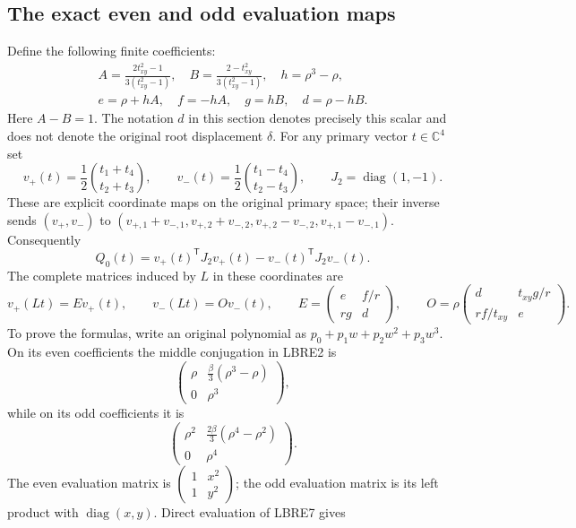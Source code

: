 \documentclass[11pt,a4paper]{article}
\begin{document}
\subsection{The exact even and odd evaluation maps}
Define the following finite coefficients:
\[
 \begin{gathered}
 A=\frac{2t_{xy}^2-1}{3(t_{xy}^2-1)},\quad
 B=\frac{2-t_{xy}^2}{3(t_{xy}^2-1)},\quad h=\rho^3-\rho,\\
 e=\rho+hA,\quad f=-hA,\quad g=hB,\quad d=\rho-hB.
 \end{gathered}
 \tag{LBRE3}
\]
Here $A-B=1$. The notation $d$ in this section denotes precisely
this scalar and does not denote the original root displacement
$\delta$.
For any primary vector $t\in\mathbb C^4$ set
\[
 v_+(t)=\frac12\binom{t_1+t_4}{t_2+t_3},\qquad
 v_-(t)=\frac12\binom{t_1-t_4}{t_2-t_3},\qquad
 J_2=\operatorname{diag}(1,-1).
 \tag{LBRE4}
\]
These are explicit coordinate maps on the original primary space;
their inverse sends $(v_+,v_-)$ to
$(v_{+,1}+v_{-,1},v_{+,2}+v_{-,2},
v_{+,2}-v_{-,2},v_{+,1}-v_{-,1})$.
Consequently
\[
 Q_0(t)=v_+(t)^{\mathsf T}J_2v_+(t)
        -v_-(t)^{\mathsf T}J_2v_-(t).
 \tag{LBRE5}
\]
The complete matrices induced by $L$ in these coordinates are
\[
 v_+(Lt)=E v_+(t),\qquad v_-(Lt)=O v_-(t),\qquad
 E=\begin{pmatrix}e&f/r\\rg&d\end{pmatrix},\qquad
 O=\rho\begin{pmatrix}d&t_{xy} g/r\\rf/t_{xy}&e\end{pmatrix}.
 \tag{LBRE6}
\]
To prove the formulas, write an original polynomial as
$p_0+p_1w+p_2w^2+p_3w^3$. On its even coefficients the middle
conjugation in LBRE2 is
\[
 \begin{pmatrix}\rho&\frac{\beta}{3}(\rho^3-\rho)\\
 0&\rho^3\end{pmatrix},
 \tag{LBRE7}
\]
while on its odd coefficients it is
\[
 \begin{pmatrix}\rho^2&\frac{2\beta}{3}(\rho^4-\rho^2)\\
 0&\rho^4\end{pmatrix}.
 \tag{LBRE8}
\]
The even evaluation matrix is
$\left(\begin{smallmatrix}1&x^2\\1&y^2\end{smallmatrix}\right)$;
the odd evaluation matrix is its left product with
$\operatorname{diag}(x,y)$. Direct evaluation of LBRE7 gives
\end{document}
